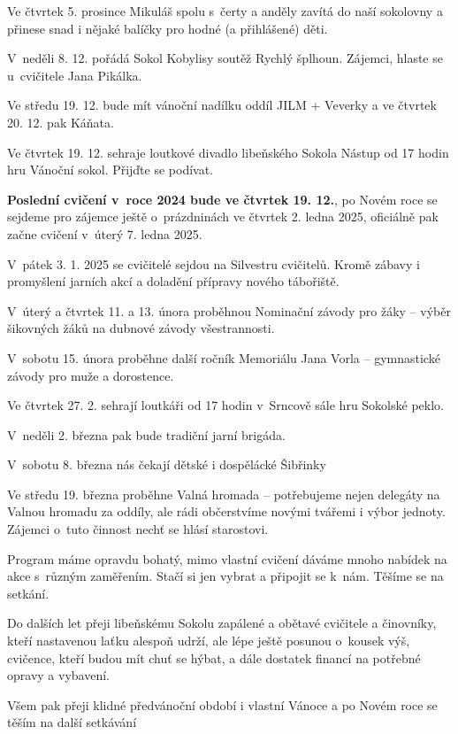 \documentclass[11pt]{article}
\begin{document}

Ve čtvrtek 5. prosince Mikuláš spolu s~čerty a anděly zavítá do naší sokolovny a přinese snad i nějaké balíčky pro hodné (a přihlášené) děti.

V~neděli 8. 12. pořádá Sokol Kobylisy soutěž Rychlý šplhoun. Zájemci, hlaste se u~cvičitele Jana Pikálka.

Ve středu 19. 12. bude mít vánoční nadílku oddíl JILM + Veverky a ve čtvrtek 20. 12. pak Káňata. 

Ve čtvrtek 19. 12. sehraje loutkové divadlo libeňského Sokola Nástup od 17 hodin hru Vánoční sokol. Přijďte se podívat.

\textbf{Poslední cvičení v~roce 2024 bude ve čtvrtek 19. 12.}, po Novém roce se sejdeme pro zájemce ještě o~prázdninách ve čtvrtek 2. ledna 2025, oficiálně pak začne cvičení v~úterý 7. ledna 2025.

V~pátek 3. 1. 2025 se cvičitelé sejdou na Silvestru cvičitelů. Kromě zábavy i promyšlení jarních akcí a doladění přípravy nového tábořiště. 

V~úterý a čtvrtek 11. a 13. února proběhnou Nominační závody pro žáky – výběr šikovných žáků na dubnové závody všestrannosti. 

V~sobotu 15. února proběhne další ročník Memoriálu Jana Vorla – gymnastické závody pro muže a dorostence. 

Ve čtvrtek 27. 2. sehrají loutkáři od 17 hodin v~Srncově sále hru Sokolské peklo.

V~neděli 2. března pak bude tradiční jarní brigáda. 

V~sobotu 8. března nás čekají dětské i dospělácké Šibřinky 

Ve středu 19. března proběhne Valná hromada – potřebujeme nejen delegáty na Valnou hromadu za oddíly, ale rádi občerstvíme novými tvářemi i výbor jednoty. Zájemci o~tuto činnost nechť se hlásí starostovi.

Program máme opravdu bohatý, mimo vlastní cvičení dáváme mnoho nabídek na akce s~různým zaměřením. Stačí si jen vybrat a připojit se k~nám. Těšíme se na setkání.

Do dalších let přeji libeňskému Sokolu zapálené a obětavé cvičitele a činovníky, kteří nastavenou laťku alespoň udrží, ale lépe ještě posunou o~kousek výš, cvičence, kteří budou mít chuť se hýbat, a dále dostatek financí na potřebné opravy a vybavení. 

Všem pak přeji klidné předvánoční období i vlastní Vánoce a po Novém roce se těším na další setkávání
\end{document}
